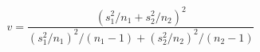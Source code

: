 \documentclass[10pt]{article}
\begin{document}
\[v = \frac{(s_1^2/n_1+s_2^2/n_2)^2}{(s_1^2/n_1)^2/(n_1-1)+(s_2^2/n_2)^2/(n_2-1)}\]
\end{document}
